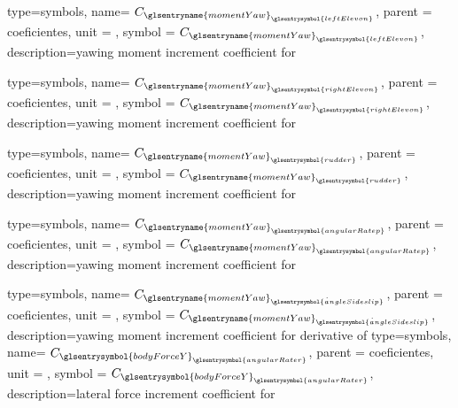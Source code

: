 {type=symbols,
    name= \ensuremath{C_{{\glsentryname{momentYaw}}_{\glsentrysymbol{leftElevon}}}},
    parent = {coeficientes},
    unit = \unexpanded{},
    symbol = \ensuremath{C_{{\glsentryname{momentYaw}}_{\glsentrysymbol{leftElevon}}}},
    description={yawing moment increment coefficient for }
}

{type=symbols,
    name= \ensuremath{C_{{\glsentryname{momentYaw}}_{\glsentrysymbol{rightElevon}}}},
    parent = {coeficientes},
    unit = \unexpanded{},
    symbol = \ensuremath{C_{{\glsentryname{momentYaw}}_{\glsentrysymbol{rightElevon}}}},
    description={yawing moment increment coefficient for }
}

{type=symbols,
    name= \ensuremath{C_{{\glsentryname{momentYaw}}_{\glsentrysymbol{rudder}}}},
    parent = {coeficientes},
    unit = \unexpanded{},
    symbol = \ensuremath{C_{{\glsentryname{momentYaw}}_{\glsentrysymbol{rudder}}}},
    description={yawing moment increment coefficient for }
}

{type=symbols,
    name= \ensuremath{C_{{\glsentryname{momentYaw}}_{\glsentrysymbol{angularRatep}}}},
    parent = {coeficientes},
    unit = \unexpanded{},
    symbol = \ensuremath{C_{{\glsentryname{momentYaw}}_{\glsentrysymbol{angularRatep}}}},
    description={yawing moment increment coefficient for }
}

{type=symbols,
    name= \ensuremath{C_{{\glsentryname{momentYaw}}_{\dot{\glsentrysymbol{angleSideslip}}}}},
    parent = {coeficientes},
    unit = \unexpanded{},
    symbol = \ensuremath{C_{{\glsentryname{momentYaw}}_{\dot{\glsentrysymbol{angleSideslip}}}}},
    description={yawing moment increment coefficient for derivative of }
}
{type=symbols,
    name= \ensuremath{C_{{\glsentrysymbol{bodyForceY}}_{\glsentrysymbol{angularRater}}}},
    parent = {coeficientes},
    unit = \unexpanded{},
    symbol = \ensuremath{C_{{\glsentrysymbol{bodyForceY}}_{\glsentrysymbol{angularRater}}}},
    description={lateral force increment coefficient for }
}


